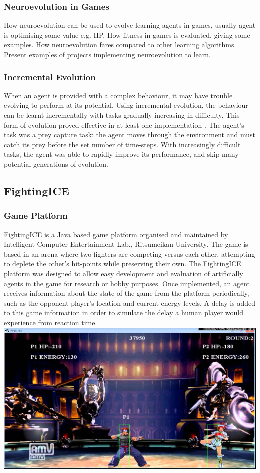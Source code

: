 \documentclass[11pt,a4paper]{article}
\begin{document}
\subsubsection{Neuroevolution in Games}
How neuroevolution can be used to evolve learning agents in games, usually agent is optimising some value e.g. HP. How fitness in games is evaluated, giving some examples. How neuroevolution fares compared to other learning algorithms. Present examples of projects implementing neuroevolution to learn.
\subsubsection{Incremental Evolution}
When an agent is provided with a complex behaviour, it may have trouble evolving to perform at its potential. Using incremental evolution, the behaviour can be learnt incrementally with tasks gradually increasing in difficulty. This form of evolution proved effective in at least one implementation \cite{incre}. The agent's task was a prey capture task: the agent moves through the environment and must catch its prey before the set number of time-steps. With increasingly difficult tasks, the agent was able to rapidly improve its performance, and skip many potential generations of evolution.

\newpage
\subsection{FightingICE}
\subsubsection{Game Platform}
FightingICE is a Java based game platform organised and maintained by Intelligent Computer Entertainment Lab., Ritsumeikan University. The game is based in an arena where two fighters are competing versus each other, attempting to deplete the other's hit-points while preserving their own. The FightingICE platform was designed to allow easy development and evaluation of artificially agents in the game for research or hobby purposes. Once implemented, an agent receives information about the state of the game from the platform periodically, such as the opponent player's location and current energy levels. A delay is added to this game information in order to simulate the delay a human player would experience from reaction time.\\
\includegraphics[width=\textwidth]{fightingICE}
\end{document}
